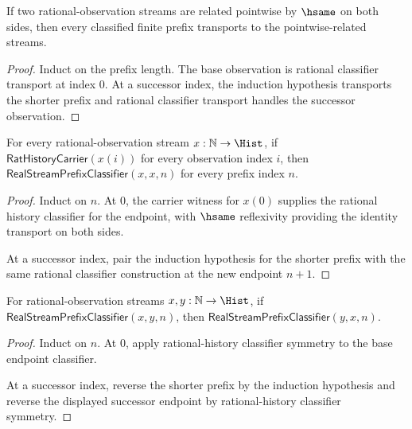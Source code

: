 \begin{theorem}
\label{thm:real-stream-prefix-classifier-hsame-transport}
If two rational-observation streams are related pointwise by $\hsame$ on both
sides, then every classified finite prefix transports to the pointwise-related
streams.
\end{theorem}
\begin{proof}
Induct on the prefix length. The base observation is rational classifier
transport at index $0$. At a successor index, the induction hypothesis
transports the shorter prefix and rational classifier transport handles the
successor observation.
\end{proof}

\begin{theorem}
\label{thm:real-stream-prefix-classifier-refl}
For every rational-observation stream $x:\mathbb{N}\to\Hist$, if
$\mathsf{RatHistoryCarrier}(x(i))$ for every observation index $i$, then
$\mathsf{RealStreamPrefixClassifier}(x,x,n)$ for every prefix index $n$.
\end{theorem}
\begin{proof}
Induct on $n$. At $0$, the carrier witness for $x(0)$ supplies the rational
history classifier for the endpoint, with $\hsame$ reflexivity providing the
identity transport on both sides.

At a successor index, pair the induction hypothesis for the shorter prefix with
the same rational classifier construction at the new endpoint $n+1$.
\end{proof}

\begin{theorem}
\label{thm:real-stream-prefix-classifier-symm}
For rational-observation streams $x,y:\mathbb{N}\to\Hist$, if
$\mathsf{RealStreamPrefixClassifier}(x,y,n)$, then
$\mathsf{RealStreamPrefixClassifier}(y,x,n)$.
\end{theorem}
\begin{proof}
Induct on $n$. At $0$, apply rational-history classifier symmetry to the base
endpoint classifier.

At a successor index, reverse the shorter prefix by the induction hypothesis and
reverse the displayed successor endpoint by rational-history classifier
symmetry.
\end{proof}

